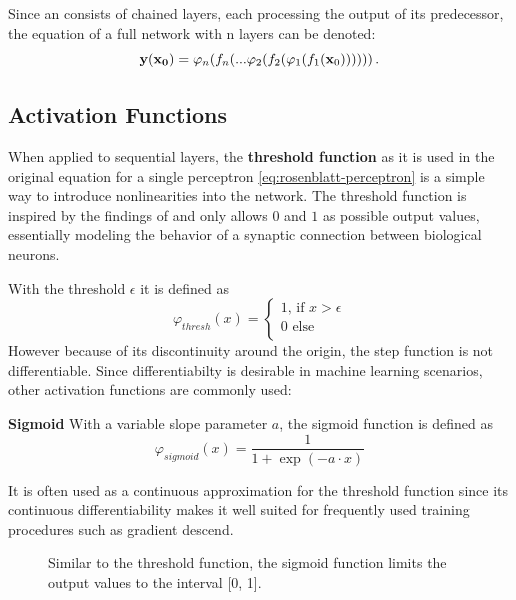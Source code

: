	Since an  consists of chained layers, each processing the output of its predecessor, the equation of a full network with n layers can be denoted:
	\begin{equation}
		\mathbf{y}(\mathbf{x_0}) = \varphi_n(f_n(... \varphi_2(f_2(\varphi_1(f_1(\mathbf{x}_0)))))) \,.
	\end{equation}
	
	\subsection{Activation Functions}
	
		When applied to sequential layers, the \textbf{threshold function} as it is used in the original equation for a single perceptron \ref{eq:rosenblatt-perceptron} is a simple way to introduce nonlinearities into the network. The threshold function is inspired by the findings of \cite{McCulloch1943} and only allows $0$ and $1$ as possible output values, essentially modeling the behavior of a synaptic connection between biological neurons. 
		
		With the threshold $\epsilon$ it is defined as
		\begin{equation}
		\label{eq:acti-sw}
		\varphi_{thresh}(x) = \left\{
		\begin{array}{ll}
		1\text{, if } x > \epsilon \\
		0 \text{ else}\\
		\end{array}
		\right.
		\end{equation}
		However because of its discontinuity around the origin, the step function is not differentiable. Since differentiabilty is desirable in machine learning scenarios, other activation functions are commonly used:
		
		\textbf{Sigmoid}
		With a variable slope parameter $a$, the sigmoid function is defined as
		\begin{equation}
		\varphi_{sigmoid}(x) = \frac{1}{1+\exp(-a \cdot x)}
		\end{equation}
		
		It is often used as a continuous approximation for the threshold function since its continuous differentiability makes it well suited for frequently used training procedures such as gradient descend.\\
		
		\begin{figure}[ht]
			\centering
			\caption{Similar to the threshold function, the sigmoid function limits the output values to the interval [0, 1].}
			\label{fig:sigmoid_plot}
		\end{figure}
		
